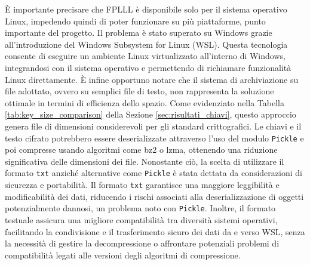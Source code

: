 È importante precisare che FPLLL è disponibile solo per il sistema operativo Linux, impedendo
quindi di poter funzionare su più piattaforme, punto importante del progetto. Il problema 
è stato superato su Windows grazie all'introduzione del Windows Subsystem for Linux (WSL). 
Questa tecnologia consente di eseguire un ambiente Linux virtualizzato  
all'interno di Windows, integrandosi con il sistema operativo e permettendo di richiamare 
funzionalità Linux direttamente.
È infine opportuno notare che il sistema di archiviazione su file adottato, ovvero su 
semplici file di testo, non 
rappresenta la soluzione ottimale in termini di efficienza dello spazio. 
Come evidenziato nella Tabella \ref{tab:key_size_comparison} della Sezione 
\ref{sec:risultati_chiavi}, questo approccio genera file di dimensioni considerevoli 
per gli standard crittografici. Le chiavi e il testo cifrato potrebbero essere deserializzate
attraverso l'uso del modulo \texttt{Pickle} e poi compresse usando algoritmi come bz2 o lzma, 
ottenendo una riduzione significativa delle dimensioni dei file. 
Nonostante ciò, la scelta di utilizzare il formato \texttt{txt} anziché alternative come \texttt{Pickle} 
è stata dettata da considerazioni di sicurezza e portabilità. Il formato \texttt{txt} garantisce 
una maggiore leggibilità e modificabilità dei dati, riducendo i rischi associati alla 
deserializzazione di oggetti potenzialmente dannosi, un problema noto con \texttt{Pickle}. 
Inoltre, il formato testuale assicura una migliore compatibilità tra diversità
sistemi operativi, facilitando la condivisione e il trasferimento sicuro 
dei dati da e verso WSL, senza la necessità di gestire la decompressione o affrontare
potenziali problemi di compatibilità legati alle versioni degli algoritmi di compressione. 

%
%

%
%
